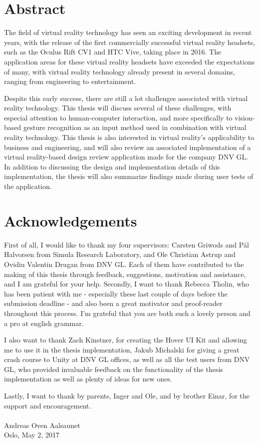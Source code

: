 \chapter*{Abstract}                    
The field of virtual reality technology has seen an exciting development in recent years, 
with the release of the first commercially successful virtual reality headsets, such as the Oculus Rift CV1 and HTC Vive, taking place in 2016.
The application areas for these virtual reality headsets have exceeded the expectations of many, with virtual reality 
technology already present in several domains, ranging from engineering to entertainment.

Despite this early success, there are still a lot challenges associated with virtual reality technology. This thesis will discuss several of these challenges, 
with especial attention to human-computer interaction, and more specifically to vision-based gesture recognition as an input method used in combination with virtual reality technology. 
This thesis is also interested in virtual reality's applicability to business and engineering, and will also review an associated implementation of a virtual reality-based 
design review application made for the company DNV GL. In addition to discussing the design and implementation details of this implementation, the thesis will also summarize 
findings made during user tests of the application. 

\chapter*{Acknowledgements}  
First of all, I would like to thank my four supervisors: Carsten Griwods and Pål Halvorsen from Simula Research Laboratory, and Ole Christian Astrup and Ovidiu Valentin Drugan 
from DNV GL. Each of them have contributed to the making of this thesis through feedback, suggestions, motivation and assistance, and I am grateful for your help.
Secondly, I want to thank Rebecca Tholin, who has been patient with me - especially these last couple of days before the submission deadline - and also
been a great motivator and proof-reader throughout this process. I'm grateful that you are both such a lovely person and a pro at english grammar.

I also want to thank Zach Kinstner, for creating the Hover UI Kit and allowing me to use it in the thesis implementation,  
Jakub Michalski for giving a great crash course to Unity at DNV GL offices, as well as all the test users from DNV GL, 
who provided invaluable feedback on the functionality of the thesis implementation as well as plenty of ideas for new ones.

Lastly, I want to thank by parents, Inger and Ole, and by brother Einar, for the support and encouragement. \\\\


\noindent
Andreas Oven Aalsaunet \\
Oslo, May 2, 2017






